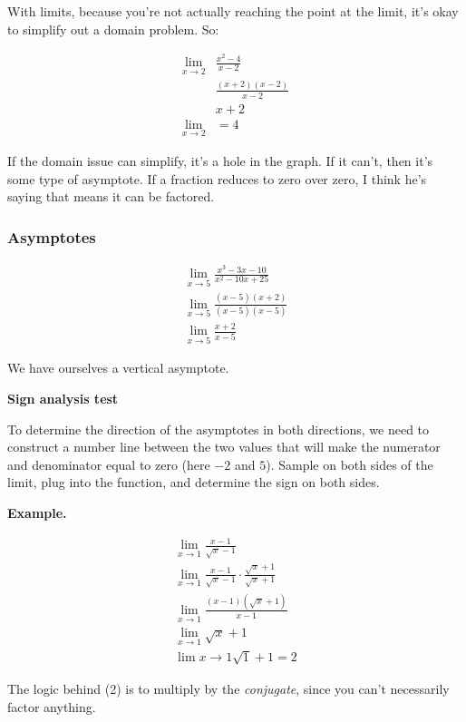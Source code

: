 \documentclass{article}
\begin{document}
\begin{enumerate}
With limits, because you're not actually reaching the point at the limit, it's okay to
simplify out a domain problem. So:

\begin{align*}
    \lim_{x\to 2} &\frac{x^2 -4}{x-2}\\
                  & \frac{(x+2)(x-2)}{x-2}\\
                  & x+2\\
    \lim_{x\to 2} &= 4
\end{align*}

If the domain issue can simplify, it's a hole in the graph. If it can't, then it's some
type of asymptote. If a fraction reduces to zero over zero, I think he's saying that means
it can be factored.

\subsubsection{Asymptotes}

\begin{align*}
    \lim_{x \to 5} \frac{x^3 - 3x - 10}{x^2 - 10x + 25}\\
    \lim_{x \to 5} \frac{(x-5)(x+2)}{(x-5)(x-5)}\\
    \lim_{x \to 5} \frac{x+2}{x-5}
\end{align*}

We have ourselves a vertical asymptote.

\textbf{Sign analysis test}

To determine the direction of the asymptotes in both directions, we need to construct a
number line between the two values that will make the numerator and denominator equal to
zero (here $-2$ and $5$). Sample on both sides of the limit, plug into the function, and
determine the sign on both sides.


\textbf{Example.}

\begin{align}
    \lim_{x \to 1} \frac{x-1}{\sqrt{x} - 1}\\
    \lim_{x \to 1} \frac{x-1}{\sqrt{x} - 1} \cdot \frac{\sqrt{x} + 1}{\sqrt{x} + 1}\\
    \lim_{x \to 1} \frac{(x - 1)(\sqrt{x} + 1)}{x - 1}\\
    \lim_{x \to 1} \sqrt{x} + 1\\
    \lim{x \to 1} \sqrt{1} + 1 = 2
\end{align}

The logic behind (2) is to multiply by the \emph{conjugate}, since you can't necessarily
factor anything. 


\end{enumerate}
\end{document}
